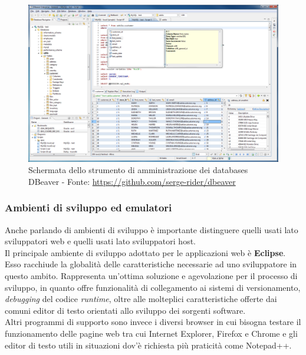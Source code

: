 	\begin{figure}[H]
	\centering
	\includegraphics[width=1\textwidth]{immagini/DBeaver_ss}
	\caption{Schermata dello strumento di amministrazione dei databases DBeaver - Fonte: \url{https://github.com/serge-rider/dbeaver}}
	\end{figure}

	\subsubsection{Ambienti di sviluppo ed emulatori}
	\label{Ambienti di sviluppo ed emulatori}

	Anche parlando di ambienti di sviluppo è importante distinguere quelli usati lato sviluppatori web e quelli usati lato sviluppatori host.\\
		
	Il principale ambiente di sviluppo adottato per le applicazioni web è \textbf{Eclipse}. Esso racchiude la globalità delle caratteristiche necessarie ad uno sviluppatore in questo ambito. Rappresenta un'ottima soluzione e agevolazione per il processo di sviluppo, in quanto offre funzionalità di collegamento ai sistemi di versionamento, \textit{debugging} del codice \textit{runtime}, oltre alle molteplici caratteristiche offerte dai comuni editor di testo orientati allo sviluppo dei sorgenti software.\\
	
	
	Altri programmi di supporto sono invece i diversi browser in cui bisogna testare il funzionamento delle pagine web tra cui Internet Explorer, Firefox e Chrome e gli editor di testo utili in situazioni dov'è richiesta più praticità come Notepad++.\\

